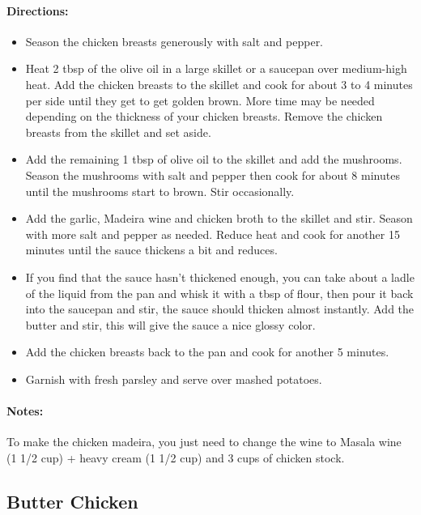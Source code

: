 \documentclass{article}
\begin{document}
\paragraph{Directions:}
\begin{itemize}
	\item Season the chicken breasts generously with salt and pepper.
	\item Heat 2 tbsp of the olive oil in a large skillet or a saucepan over medium-high heat. Add the chicken
	breasts to the skillet and cook for about 3 to 4 minutes per side until they get to get golden brown. More
	time may be needed depending on the thickness of your chicken breasts. Remove the chicken breasts from
	the skillet and set aside.
	\item Add the remaining 1 tbsp of olive oil to the skillet and add the mushrooms. Season the mushrooms with
	salt and pepper then cook for about 8 minutes until the mushrooms start to brown. Stir occasionally.
	\item Add the garlic, Madeira wine and chicken broth to the skillet and stir. Season with more salt and pepper
	as needed. Reduce heat and cook for another 15 minutes until the sauce thickens a bit and reduces.
	\item If you find that the sauce hasn’t thickened enough, you can take about a ladle of the liquid from the pan
	and whisk it with a tbsp of flour, then pour it back into the saucepan and stir, the sauce should thicken
	almost instantly. Add the butter and stir, this will give the sauce a nice glossy color.
	\item Add the chicken breasts back to the pan and cook for another 5 minutes.
	\item Garnish with fresh parsley and serve over mashed potatoes.	
\end{itemize}

\paragraph{Notes:}To make the chicken madeira, you just need to change the wine to Masala wine (1 1/2 cup) + heavy cream (1 1/2 cup) and 3 cups of chicken stock.

\subsection{Butter Chicken}
\end{document}

